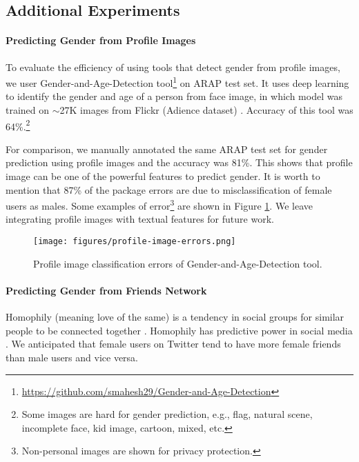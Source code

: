 \documentclass[sigconf,authorversion,nonacm]{acmart}
\begin{document}
\subsection{Additional Experiments}
\label{sec:aAdditional_exp}
\paragraph{\textbf{Predicting Gender from Profile Images}}
To evaluate the efficiency of using tools that detect gender from profile images, we user Gender-and-Age-Detection tool\footnote{\url{https://github.com/smahesh29/Gender-and-Age-Detection}} on ARAP test set. It uses deep learning to identify the gender and age of a person from face image, in which model was trained on $\sim$27K images from Flickr (Adience dataset) \cite{levi2015age}. Accuracy of this tool was 64\%.\footnote{Some images are hard for gender prediction, e.g., flag, natural scene, incomplete face, kid image, cartoon, mixed, etc.}

For comparison, we manually annotated the same ARAP test set for gender prediction using profile images and the accuracy was 81\%. This shows that profile image can be one of the powerful features to predict gender. It is worth to mention that 87\% of the package errors are due to misclassification of female users as males. Some examples of error\footnote{Non-personal images are shown for privacy protection.} are shown in Figure \ref{fig:profile-image-errors}. We leave integrating profile images with textual features for future work. 

\begin{figure}[h]
	\begin{center}
		\texttt{[image: figures/profile-image-errors.png]} 
		\caption{Profile image classification errors of Gender-and-Age-Detection tool.  %
		}
		\label{fig:profile-image-errors}
	\end{center}
\end{figure}


\paragraph{\textbf{Predicting Gender from Friends Network}}
Homophily (meaning love of the same) is a tendency in social groups for similar people to be connected together \cite{mcpherson2001birds}. Homophily has predictive power in social media \cite{bischoff2012we}. We anticipated that female users on Twitter tend to have more female friends than male users and vice versa. 
\end{document}

